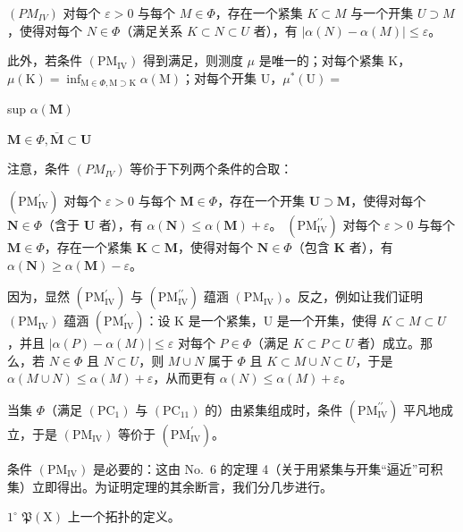 \((PM_{IV})\) 对每个 \(\varepsilon > 0\) 与每个 \(M \in \Phi\)，存在一个紧集 \(K \subset M\) 与一个开集 \(U \supset M\)，使得对每个 \(N \in \Phi\)（满足关系 \(K \subset N \subset U\) 者），有 \(|\alpha(N) - \alpha(M)| \leqslant \varepsilon\)。

此外，若条件 \((\mathrm{PM}_{\mathrm{IV}})\) 得到满足，则测度 \(\mu\) 是唯一的；对每个紧集 K，\(\mu(\mathrm{K}) = \inf_{\mathrm{M} \in \Phi, \mathrm{M} \supset \mathrm{K}} \alpha(\mathrm{M})\)；对每个开集 U，\(\mu^{*}(\mathrm{U}) =\)

sup \(\alpha (\mathbf{M})\)

\(\mathbf{M}\in \Phi ,\bar{\mathbf{M}}\subset \mathbf{U}\)

注意，条件 \((PM_{IV})\) 等价于下列两个条件的合取：

\((\mathrm{PM}_{\mathrm{IV}}^{\prime})\) 对每个 \(\varepsilon > 0\) 与每个 \(\mathbf{M} \in \Phi\)，存在一个开集 \(\mathbf{U} \supset \mathbf{M}\)，使得对每个 \(\mathbf{N} \in \Phi\)（含于 \(\mathbf{U}\) 者），有 \(\alpha(\mathbf{N}) \leqslant \alpha(\mathbf{M}) + \varepsilon\)。 \((\mathrm{PM}_{\mathrm{IV}}^{\prime \prime})\) 对每个 \(\varepsilon > 0\) 与每个 \(\mathbf{M} \in \Phi\)，存在一个紧集 \(\mathbf{K} \subset \mathbf{M}\)，使得对每个 \(\mathbf{N} \in \Phi\)（包含 \(\mathbf{K}\) 者），有 \(\alpha(\mathbf{N}) \geqslant \alpha(\mathbf{M}) - \varepsilon\)。

因为，显然 \((\mathrm{PM}_{\mathrm{IV}}^{\prime})\) 与 \((\mathrm{PM}_{\mathrm{IV}}^{\prime\prime})\) 蕴涵 \((\mathrm{PM}_{\mathrm{IV}})\)。反之，例如让我们证明 \((\mathrm{PM}_{\mathrm{IV}})\) 蕴涵 \((\mathrm{PM}_{\mathrm{IV}}^{\prime})\)：设 K 是一个紧集，U 是一个开集，使得 \(K \subset M \subset U\)，并且 \(|\alpha(P) - \alpha(M)| \leqslant \varepsilon\) 对每个 \(P \in \Phi\)（满足 \(K \subset P \subset U\) 者）成立。那么，若 \(N \in \Phi\) 且 \(N \subset U\)，则 \(M \cup N\) 属于 \(\Phi\) 且 \(K \subset M \cup N \subset U\)，于是 \(\alpha(M \cup N) \leqslant \alpha(M) + \varepsilon\)，从而更有 \(\alpha(N) \leqslant \alpha(M) + \varepsilon\)。

当集 \(\Phi\)（满足 \((\mathrm{PC}_{1})\) 与 \((\mathrm{PC}_{11})\) 的）由紧集组成时，条件 \((\mathrm{PM}_{\mathrm{IV}}^{\prime \prime})\) 平凡地成立，于是 \((\mathrm{PM}_{\mathrm{IV}})\) 等价于 \((\mathrm{PM}_{\mathrm{IV}}^{\prime})\)。

条件 \((\mathrm{PM}_{\mathrm{IV}})\) 是必要的：这由 No.~6 的定理 4（关于用紧集与开集“逼近”可积集）立即得出。为证明定理的其余断言，我们分几步进行。

\(1^{\circ}\) \(\mathfrak{P}(\mathrm{X})\) 上一个拓扑的定义。

